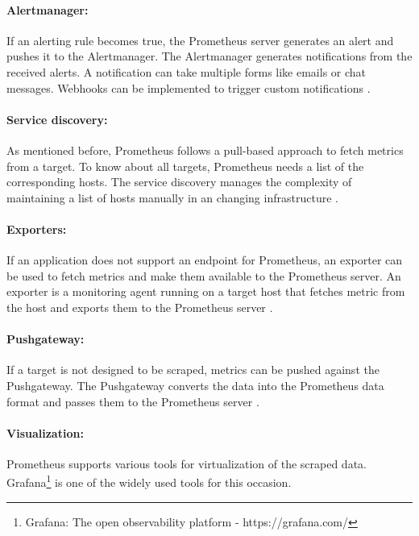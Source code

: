 \paragraph{Alertmanager:}
If an alerting rule becomes true, the Prometheus server generates an alert and pushes it to the Alertmanager. The Alertmanager generates notifications from the received alerts. A notification can take multiple forms like emails or chat messages. Webhooks can be implemented to trigger custom notifications \cite{Bastos2019Prom}.


\paragraph{Service discovery:}
As mentioned before, Prometheus follows a pull-based approach to fetch metrics from a target. To know about all targets, Prometheus needs a list of the corresponding hosts. The service discovery manages the complexity of maintaining a list of hosts manually in an changing infrastructure \cite{Bastos2019Prom}.


\paragraph{Exporters:}
If an application does not support an endpoint for Prometheus, an exporter can be used to fetch metrics and make them available to the Prometheus server. An exporter is a monitoring agent running on a target host that fetches metric from the host and exports them to the Prometheus server \cite{Pandey2020Monitoring}.


\paragraph{Pushgateway:}
If a target is not designed to be scraped, metrics can be pushed against the Pushgateway\cite{Prom2020Docs}. The Pushgateway converts the data into the Prometheus data format and passes them to the Prometheus server \cite{Pandey2020Monitoring}.


\paragraph{Visualization:}
Prometheus supports various tools for virtualization of the scraped data. Grafana\footnote{Grafana: The open observability platform - https://grafana.com/} is one of the widely used tools for this occasion.


